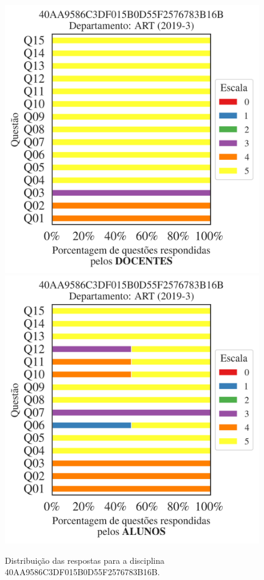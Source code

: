 \documentclass[a4paper,10pt]{article}
\begin{document}
\begin{figure}[h]
\centering
\includegraphics[width=0.485\linewidth]{analise_disciplina_departamento_ART_40AA9586C3DF015B0D55F2576783B16B_docentes.png}
\includegraphics[width=0.485\linewidth]{analise_disciplina_departamento_ART_40AA9586C3DF015B0D55F2576783B16B_alunos.png}
\caption{\label{fig:analise_geral_departamento}                Distribuição das respostas para a disciplina 40AA9586C3DF015B0D55F2576783B16B. }
\end{figure}
\end{document}
